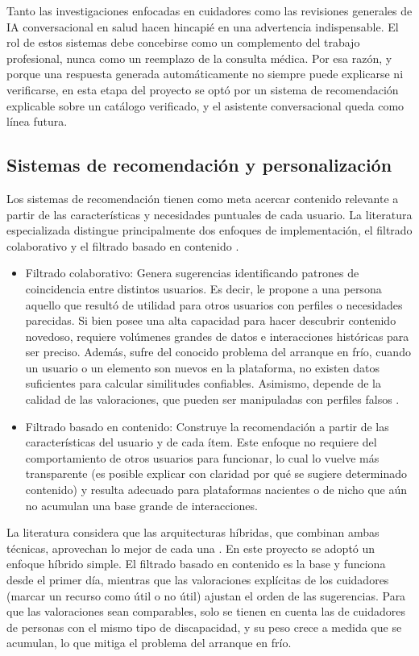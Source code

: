 Tanto las investigaciones enfocadas en cuidadores como las revisiones generales de IA conversacional en salud hacen hincapié en una advertencia indispensable. El rol de estos sistemas debe concebirse como un complemento del trabajo profesional, nunca como un reemplazo de la consulta médica. Por esa razón, y porque una respuesta generada automáticamente no siempre puede explicarse ni verificarse, en esta etapa del proyecto se optó por un sistema de recomendación explicable sobre un catálogo verificado, y el asistente conversacional queda como línea futura.

\subsection{Sistemas de recomendación y personalización}

Los sistemas de recomendación tienen como meta acercar contenido relevante a partir de las características y necesidades puntuales de cada usuario. La literatura especializada distingue principalmente dos enfoques de implementación, el filtrado colaborativo y el filtrado basado en contenido \citep{jain2025,geeksforgeeks2025}.

\begin{itemize}
    \item Filtrado colaborativo: Genera sugerencias identificando patrones de coincidencia entre distintos usuarios. Es decir, le propone a una persona aquello que resultó de utilidad para otros usuarios con perfiles o necesidades parecidas. Si bien posee una alta capacidad para hacer descubrir contenido novedoso, requiere volúmenes grandes de datos e interacciones históricas para ser preciso. Además, sufre del conocido problema del arranque en frío, cuando un usuario o un elemento son nuevos en la plataforma, no existen datos suficientes para calcular similitudes confiables. Asimismo, depende de la calidad de las valoraciones, que pueden ser manipuladas con perfiles falsos \citep{chichani2024}.
    \item Filtrado basado en contenido: Construye la recomendación a partir de las características del usuario y de cada ítem. Este enfoque no requiere del comportamiento de otros usuarios para funcionar, lo cual lo vuelve más transparente (es posible explicar con claridad por qué se sugiere determinado contenido) y resulta adecuado para plataformas nacientes o de nicho que aún no acumulan una base grande de interacciones.
\end{itemize}

La literatura considera que las arquitecturas híbridas, que combinan ambas técnicas, aprovechan lo mejor de cada una \citep{jain2025}. En este proyecto se adoptó un enfoque híbrido simple. El filtrado basado en contenido es la base y funciona desde el primer día, mientras que las valoraciones explícitas de los cuidadores (marcar un recurso como útil o no útil) ajustan el orden de las sugerencias. Para que las valoraciones sean comparables, solo se tienen en cuenta las de cuidadores de personas con el mismo tipo de discapacidad, y su peso crece a medida que se acumulan, lo que mitiga el problema del arranque en frío.

